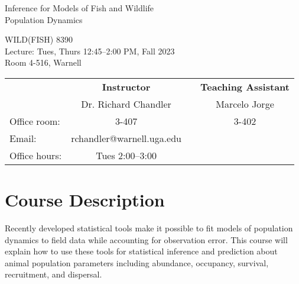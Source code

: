 \documentclass[12pt]{article}
\begin{document}

{\centering

{\Large \sc
  Inference for Models of Fish and Wildlife \\ Population Dynamics  
}
\vspace{6pt}

WILD(FISH) 8390  \\
Lecture: Tues, Thurs 12:45--2:00 PM, Fall 2023 \\
Room 4-516, Warnell \\


\normalsize

\vspace{12pt}

\begin{tabular}[h!]{lccc}
                     & \textbf{Instructor}       & \hspace{0.01cm} & \textbf{Teaching Assistant} \\
                     & Dr. Richard Chandler      &                 & Marcelo Jorge                \\
Office room:         & 3-407                     &                 & 3-402                       \\
Email:               & rchandler@warnell.uga.edu &                 &         \\
Office hours:        & Tues 2:00--3:00           &                 &               \\
\end{tabular}


}



\normalsize


\vspace{-2mm}
\section*{\normalsize Course Description}
\vspace{-4mm}
Recently developed statistical tools make it possible to fit models of
population dynamics to field data while accounting for observation
error. This course will explain how to use these tools for statistical
inference and prediction about animal population parameters including
abundance, occupancy, survival, recruitment, and dispersal.   
\end{document}
